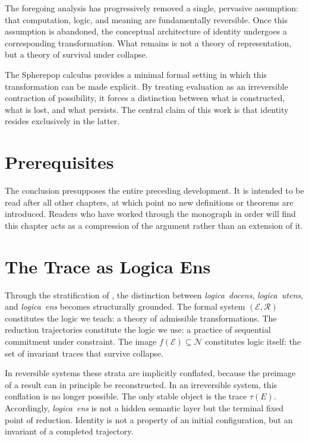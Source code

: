 \documentclass[12pt, oneside]{amsbook}
\theoremstyle{plain}
\theoremstyle{definition}
\theoremstyle{remark}
\newcommand{\Expr}{\mathcal{E}}
\newcommand{\NF}{\mathcal{N}}
\newcommand{\evalf}{f}
\newcommand{\trace}{\tau}
\newcommand{\ruleR}{\mathcal{R}}
\newcommand{\docens}{\textit{logica~docens}}
\newcommand{\utens}{\textit{logica~utens}}
\newcommand{\ens}{\textit{logica~ens}}
\begin{document}
\medskip

The foregoing analysis has progressively removed a single, pervasive
assumption: that computation, logic, and meaning are fundamentally reversible.
Once this assumption is abandoned, the conceptual architecture of identity
undergoes a corresponding transformation. What remains is not a theory of
representation, but a theory of survival under collapse.

The Spherepop calculus provides a minimal formal setting in which this
transformation can be made explicit. By treating evaluation as an irreversible
contraction of possibility, it forces a distinction between what is constructed,
what is lost, and what persists. The central claim of this work is that identity
resides exclusively in the latter.

\section{Prerequisites}

The conclusion presupposes the entire preceding development. It is intended to be read after all other chapters, at which point no new definitions or theorems are introduced. Readers who have worked through the monograph in order will find this chapter acts as a compression of the argument rather than an extension of it.

\section{The Trace as Logica Ens}
\label{sec:concl:ens}

Through the stratification of , the distinction between
\docens{}, \utens{}, and \ens{} becomes structurally grounded. The formal system
$(\Expr, \ruleR)$ constitutes the logic we teach: a theory of admissible
transformations. The reduction trajectories constitute the logic we use: a
practice of sequential commitment under constraint. The image
$\evalf(\Expr) \subseteq \NF$ constitutes logic itself: the set of invariant
traces that survive collapse.

In reversible systems these strata are implicitly conflated, because the
preimage of a result can in principle be reconstructed. In an irreversible
system, this conflation is no longer possible. The only stable object is the
trace $\trace(E)$. Accordingly, \ens{} is not a hidden semantic layer but the
terminal fixed point of reduction. Identity is not a property of an initial
configuration, but an invariant of a completed trajectory.
\end{document}
